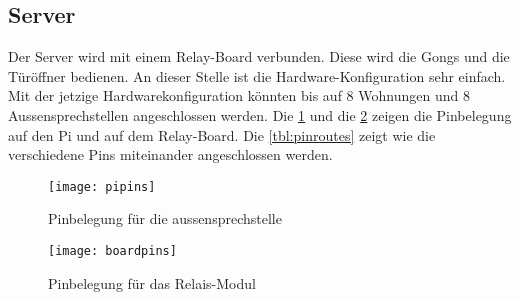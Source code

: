 \subsection{Server}
\label{sec:chapterexample}

Der Server wird mit einem Relay-Board verbunden. Diese wird die Gongs und die Türöffner bedienen. An dieser Stelle ist die Hardware-Konfiguration sehr einfach. Mit der jetzige Hardwarekonfiguration könnten bis auf 8 Wohnungen und 8 Aussensprechstellen angeschlossen werden. Die \cref{fig:pipins} und die \cref{fig:boardpins} zeigen die Pinbelegung auf den Pi und auf dem Relay-Board. Die \cref{tbl:pinroutes} zeigt wie die verschiedene Pins miteinander angeschlossen werden.

\begin{figure}[htb!]
	\begin{center}
		\texttt{[image: pipins]}
		\caption[EthernetPinbelegung]{Pinbelegung für die \gls{aussensprechstelle}}
		\label{fig:pipins}
	\end{center}
\end{figure}

\begin{figure}[htb!]
	\begin{center}
		\texttt{[image: boardpins]}
		\caption[EthernetPinbelegung]{Pinbelegung für das Relais-Modul}
		\label{fig:boardpins}
	\end{center}
\end{figure}

